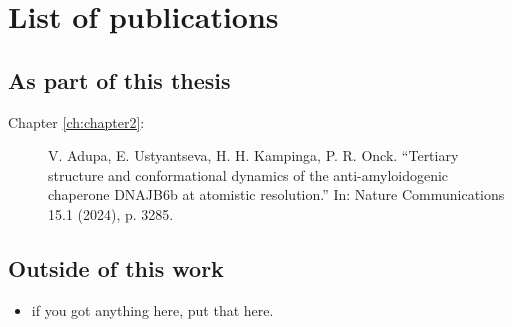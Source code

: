 
\chapter{List of publications}
\thispagestyle{noheadrule}

\section*{As part of this thesis}

\pgfmathsetmacro\chapclrtwo{\colourarray[2]}
\pgfmathsetmacro\chapclrthree{\colourarray[3]}
\pgfmathsetmacro\chapclrfour{\colourarray[4]}
\pgfmathsetmacro\chapclrfive{\colourarray[5]}

{ \small
\begin{description}
  \item[\textcolor{\chapclrtwo}{Chapter \ref{ch:chapter2}}:] V. Adupa, E. Ustyantseva, H. H. Kampinga, P. R. Onck. \enquote{Tertiary structure and conformational dynamics of the anti-amyloidogenic chaperone DNAJB6b at atomistic resolution.} In: Nature Communications 15.1 (2024), p. 3285.
\end{description}
}

\clearpage

\section*{Outside of this work}
{ \small
\begin{itemize}
  \item if you got anything here, put that here.
\end{itemize}
}

